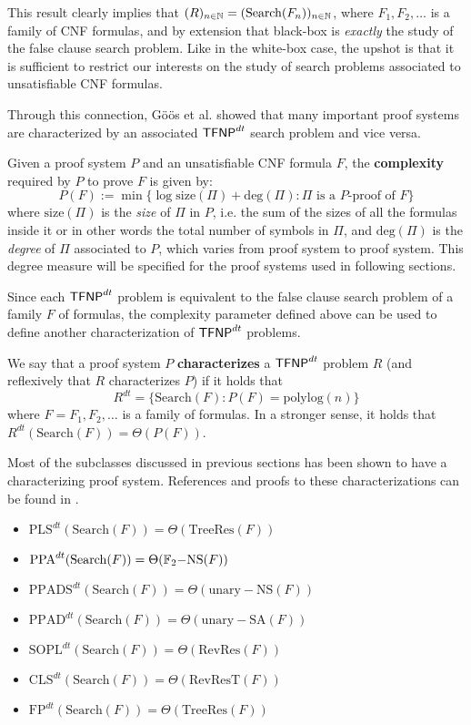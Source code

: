 This result clearly implies that $(R)_{n \in \mathbb{N}} = (\mathrm{Search}(F_n))_{n \in \mathbb{N}}$, where $F_1, F_2, \ldots$ is a family of CNF formulas, and by extension that black-box \TFNP is \textit{exactly} the study of the false clause search problem. Like in the white-box case, the upshot is that it is sufficient to restrict our interests on the study of search problems associated to unsatisfiable CNF formulas.

Through this connection, Göös et al. \cite{adventures_monotone_tfnp} showed that many important proof systems are characterized by an associated $\mathsf{TFNP}^{dt}$ search problem and vice versa. 

Given a proof system $P$ and an unsatisfiable CNF formula $F$, the \textbf{complexity} required by $P$ to prove $F$ is given by:
\[P(F) := \min\{\log \mathrm{size}(\Pi) + \mathrm{deg}(\Pi) : \Pi \text{ is a $P$-proof of } F\}\]
where $\mathrm{size}(\Pi)$ is the \textit{size} of $\Pi$ in $P$, i.e. the sum of the sizes of all the formulas inside it or in other words the total number of symbols in $\Pi$, and $\mathrm{deg}(\Pi)$ is the \textit{degree} of $\Pi$ associated to $P$, which varies from proof system to proof system. This degree measure will be specified for the proof systems used in following sections.

Since each $\mathsf{TFNP}^{dt}$ problem is equivalent to the false clause search problem of a family $F$ of formulas, the complexity parameter defined above can be used to define another characterization of $\mathsf{TFNP}^{dt}$ problems.

\begin{definition}
    We say that a proof system $P$ \textbf{characterizes} a $\mathsf{TFNP}^{dt}$ problem $R$ (and reflexively that $R$ characterizes $P$) if it holds that \[R^{dt} = \{\mathrm{Search}(F) : P(F) = \mathrm{polylog}(n)\}\]
    where $F = F_1, F_2, \ldots$ is a family of formulas. In a stronger sense, it holds that $R^{dt}(\mathrm{Search}(F)) = \Theta(P(F))$.
\end{definition}

Most of the \TFNP subclasses discussed in previous sections has been shown to have a characterizing proof system. References and proofs to these characterizations can be found in \cite{separations_proof_complexity,tfnp_characterization}.
\begin{itemize}
    \item $\mathrm{PLS}^{dt}(\mathrm{Search}(F)) = \Theta(\mathrm{TreeRes}(F))$
    \item $\mathrm{PPA}^{dt}(\mathrm{Search}(F)) = \Theta(\mathbb{F}_2\mathrm{-NS}(F))$
    \item $\mathrm{PPADS}^{dt}(\mathrm{Search}(F)) = \Theta(\mathrm{unary-NS}(F))$
    \item $\mathrm{PPAD}^{dt}(\mathrm{Search}(F)) = \Theta(\mathrm{unary-SA}(F))$
    \item $\mathrm{SOPL}^{dt}(\mathrm{Search}(F)) = \Theta(\mathrm{RevRes}(F))$
    \item $\mathrm{CLS}^{dt}(\mathrm{Search}(F)) = \Theta(\mathrm{RevResT}(F))$
    \item $\mathrm{FP}^{dt}(\mathrm{Search}(F)) = \Theta(\mathrm{TreeRes}(F))$
\end{itemize}

